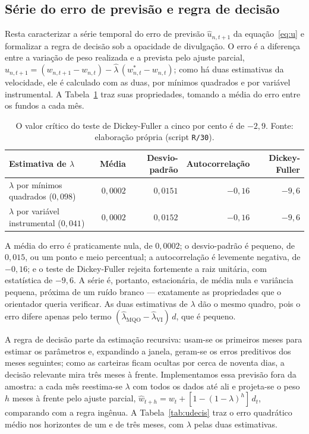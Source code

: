 \documentclass[12pt,a4paper]{article}
\begin{document}
\subsection{Série do erro de previsão e regra de decisão}
\label{sec:decis}

Resta caracterizar a série temporal do erro de previsão $\widehat{u}_{n,t+1}$ da
equação~\eqref{eq:u} e formalizar a regra de decisão sob a opacidade de divulgação. O erro é a
diferença entre a variação de peso realizada e a prevista pelo ajuste parcial,
$\widehat{u}_{n,t+1} = (w_{n,t+1}-w_{n,t}) - \widehat{\lambda}\,(w^{*}_{n,t}-w_{n,t})$; como há duas
estimativas da velocidade, ele é calculado com as duas, por mínimos quadrados e por variável
instrumental. A Tabela~\ref{tab:userie} traz suas propriedades, tomando a média do erro entre os
fundos a cada mês.

\begin{table}[h]\centering\small
\caption{Propriedades da série do erro de previsão $\widehat{u}_{n,t+1}$ (média por mês).}
\label{tab:userie}
\begin{tabular}{@{}lrrrr@{}}
\toprule
Estimativa de $\lambda$ & Média & Desvio-padrão & Autocorrelação & Dickey-Fuller \\
\midrule
$\lambda$ por mínimos quadrados ($0{,}098$)   & $0{,}0002$ & $0{,}0151$ & $-0{,}16$ & $-9{,}6$ \\
$\lambda$ por variável instrumental ($0{,}041$) & $0{,}0002$ & $0{,}0152$ & $-0{,}16$ & $-9{,}6$ \\
\bottomrule
\end{tabular}
\caption*{\footnotesize O valor crítico do teste de Dickey-Fuller a cinco por cento é de $-2{,}9$.
Fonte: elaboração própria (script \texttt{R/30}).}
\end{table}

A média do erro é praticamente nula, de $0{,}0002$; o desvio-padrão é pequeno, de $0{,}015$, ou um
ponto e meio percentual; a autocorrelação é levemente negativa, de $-0{,}16$; e o teste de
Dickey-Fuller rejeita fortemente a raiz unitária, com estatística de $-9{,}6$. A série é, portanto,
estacionária, de média nula e variância pequena, próxima de um ruído branco --- exatamente as
propriedades que o orientador queria verificar. As duas estimativas de $\lambda$ dão o mesmo
quadro, pois o erro difere apenas pelo termo $(\widehat{\lambda}_{\text{MQO}}-\widehat{\lambda}_{\text{VI}})\,d$,
que é pequeno.

A regra de decisão parte da estimação recursiva: usam-se os primeiros meses para estimar os
parâmetros e, expandindo a janela, geram-se os erros preditivos dos meses seguintes; como as
carteiras ficam ocultas por cerca de noventa dias, a decisão relevante mira três meses à frente.
Implementamos essa previsão fora da amostra: a cada mês reestima-se $\lambda$ com todos os dados
até ali e projeta-se o peso $h$ meses à frente pelo ajuste parcial,
$\widehat{w}_{t+h}=w_t+[1-(1-\lambda)^h]\,d_t$, comparando com a regra ingênua. A
Tabela~\ref{tab:udecis} traz o erro quadrático médio nos horizontes de um e de três meses, com
$\lambda$ pelas duas estimativas.
\end{document}
